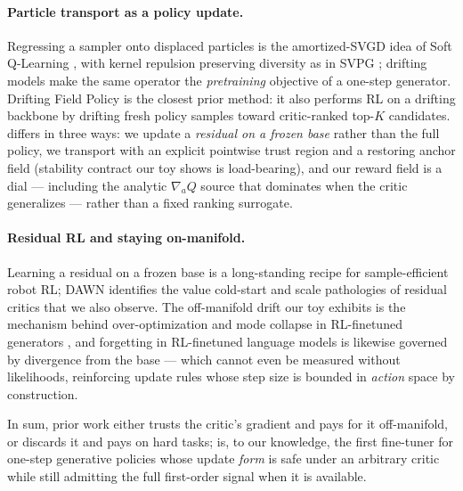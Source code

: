 \paragraph{Particle transport as a policy update.}
Regressing a sampler onto displaced particles is the amortized-SVGD idea
of Soft Q-Learning \citep{haarnoja2017sql}, with kernel repulsion
preserving diversity as in SVPG \citep{liu2017svpg}; drifting models
\citep{deng2026drifting} make the same operator the \emph{pretraining}
objective of a one-step generator. Drifting Field Policy
\citep{dfp2026} is the closest prior method: it also performs RL on a
drifting backbone by drifting fresh policy samples toward
critic-ranked top-$K$ candidates. \method{} differs in three ways: we
update a \emph{residual on a frozen base} rather than the full policy,
we transport with an explicit pointwise trust region and a restoring
anchor field (stability contract our toy shows is load-bearing),
and our reward field is a dial --- including the analytic
$\nabla_a Q$ source that dominates when the critic generalizes ---
rather than a fixed ranking surrogate.

\paragraph{Residual RL and staying on-manifold.}
Learning a residual on a frozen base is a long-standing recipe for
sample-efficient robot RL; DAWN \citep{dawn2026} identifies the value
cold-start and scale pathologies of residual critics that we also
observe. The off-manifold drift our toy exhibits is the mechanism
behind over-optimization and mode collapse in RL-finetuned generators
\citep{black2023ddpo,fan2023dpok,nakamoto2023calql}, and forgetting in
RL-finetuned language models is likewise governed by divergence from
the base \citep{rlrazor2025} --- which cannot even be measured without
likelihoods, reinforcing update rules whose step size is bounded in
\emph{action} space by construction.

In sum, prior work either trusts the critic's gradient and pays for it
off-manifold, or discards it and pays on hard tasks; \method{} is, to our
knowledge, the first fine-tuner for one-step generative policies whose
update \emph{form} is safe under an arbitrary critic while still admitting
the full first-order signal when it is available.
